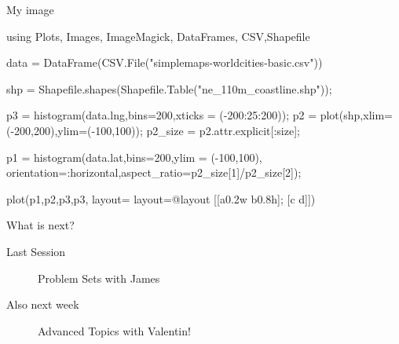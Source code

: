 \documentclass{beamer}
\newenvironment{Boxx}{\begin{tcolorbox}[standard jigsaw, opacityframe=0.8, opacityback=0.0,left=2pt,right=2pt,top=0pt,bottom=0pt]}{\end{tcolorbox}}
\begin{document}
\begin{frame}[fragile]{My image}


	
\begin{Boxx}
\begin{jllisting}	
	using Plots, Images, ImageMagick, DataFrames, CSV,Shapefile

	data = DataFrame(CSV.File("simplemaps-worldcities-basic.csv"))

	shp = Shapefile.shapes(Shapefile.Table("ne_110m_coastline.shp"));

	p3 = histogram(data.lng,bins=200,xticks = (-200:25:200));
	p2 = plot(shp,xlim=(-200,200),ylim=(-100,100));
	p2_size = p2.attr.explicit[:size];
	
	p1 = histogram(data.lat,bins=200,ylim = (-100,100),
		orientation=:horizontal,aspect_ratio=p2_size[1]/p2_size[2]);
	
	plot(p1,p2,p3,p3,
		layout= layout=@layout [[a{0.2w} b{0.8h}]; [c d]])

	\end{jllisting}


	
	
	
	


\end{Boxx}		
		

\end{frame}


\begin{frame}{What is next?}
  \begin{description}
    \item[Last Session] Problem Sets with James
    \item[Also next week] Advanced Topics with Valentin!
  \end{description}
\end{frame}
%	
%	
%	
%	
\end{document}
